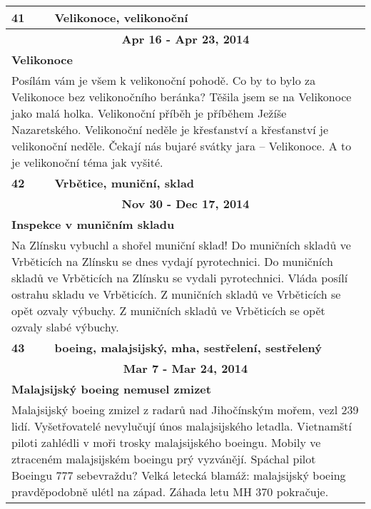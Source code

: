 \begin{tabularx}{\linewidth}{l l}
            \bf 41 & \bf Velikonoce, velikonoční \\ \midrule
            
                \multicolumn{2}{c}{\bf Apr 16 - Apr 23, 2014} \\
                \multicolumn{2}{p{\linewidth}}{\bf Velikonoce} \\
                \multicolumn{2}{p{\linewidth}}{Posílám vám je všem k velikonoční pohodě. Co by to bylo za Velikonoce bez velikonočního beránka? Těšila jsem se na Velikonoce jako malá holka. Velikonoční příběh je příběhem Ježíše Nazaretského. Velikonoční neděle je křesťanství a křesťanství je velikonoční neděle. Čekají nás bujaré svátky jara – Velikonoce. A to je velikonoční téma jak vyšité.} \\ \midrule
                [1.5pt]

            \bf 42 & \bf Vrbětice, muniční, sklad \\ \midrule
            
                \multicolumn{2}{c}{\bf Nov 30 - Dec 17, 2014} \\
                \multicolumn{2}{p{\linewidth}}{\bf Inspekce v muničním skladu} \\
                \multicolumn{2}{p{\linewidth}}{Na Zlínsku vybuchl a shořel muniční sklad! Do muničních skladů ve Vrběticích na Zlínsku se dnes vydají pyrotechnici. Do muničních skladů ve Vrběticích na Zlínsku se vydali pyrotechnici. Vláda posílí ostrahu skladu ve Vrběticích. Z muničních skladů ve Vrběticích se opět ozvaly výbuchy. Z muničních skladů ve Vrběticích se opět ozvaly slabé výbuchy.} \\ \midrule
                [1.5pt]

            \bf 43 & \bf boeing, malajsijský, mha, sestřelení, sestřelený \\ \midrule
            
                \multicolumn{2}{c}{\bf Mar 7 - Mar 24, 2014} \\
                \multicolumn{2}{p{\linewidth}}{\bf Malajsijský boeing nemusel zmizet} \\
                \multicolumn{2}{p{\linewidth}}{Malajsijský boeing zmizel z radarů nad Jihočínským mořem, vezl 239 lidí. Vyšetřovatelé nevylučují únos malajsijského letadla. Vietnamští piloti zahlédli v moři trosky malajsijského boeingu. Mobily ve ztraceném malajsijském boeingu prý vyzvánějí. Spáchal pilot Boeingu 777 sebevraždu? Velká letecká blamáž: malajsijský boeing pravděpodobně ulétl na západ. Záhada letu MH 370 pokračuje.} \\ \midrule
                

\end{tabularx}
